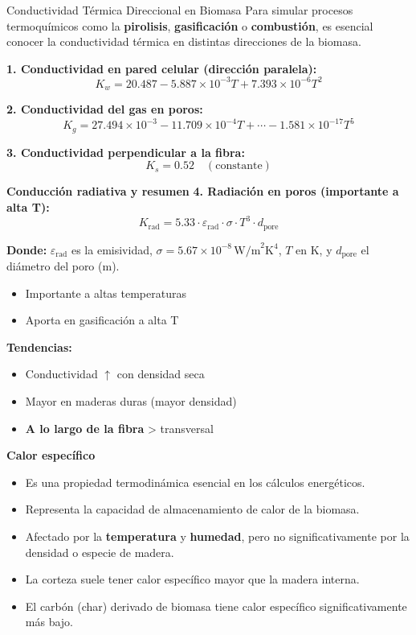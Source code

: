 \documentclass[../../main.tex]{subfiles}
\begin{document}
\begin{frame}{Conductividad Térmica Direccional en Biomasa}
\small
\justifying
Para simular procesos termoquímicos como la \textbf{pirolisis}, \textbf{gasificación} o \textbf{combustión}, es esencial conocer la conductividad térmica en distintas direcciones de la biomasa.

\textbf{1. Conductividad en pared celular (dirección paralela):}
\[
K_w = 20.487 - 5.887 \times 10^{-3} T + 7.393 \times 10^{-6} T^2
\]

\textbf{2. Conductividad del gas en poros:}
\[
K_g = 27.494 \times 10^{-3} - 11.709 \times 10^{-4} T + \cdots - 1.581 \times 10^{-17} T^5
\]

\textbf{3. Conductividad perpendicular a la fibra:}
\[
K_s = 0.52 \quad (\text{constante})
\]

\end{frame}





\begin{frame}{\textbf{Conducci\'on radiativa y resumen}}
\textbf{4. Radiación en poros (importante a alta T):}
\[
K_{\text{rad}} = 5.33 \cdot \varepsilon_{\text{rad}} \cdot \sigma \cdot T^3 \cdot d_{\text{pore}}
\]

\textbf{Donde:} \(\varepsilon_{\text{rad}}\) es la emisividad, \(\sigma = 5.67 \times 10^{-8} \, \text{W/m}^2\text{K}^4\), \(T\) en K, y \(d_{\text{pore}}\) el diámetro del poro (m).


\begin{itemize}
  \item Importante a altas temperaturas
  \item Aporta en gasificaci\'on a alta T
\end{itemize}

\vspace{0.5em}
\textbf{Tendencias:}
\begin{itemize}
  \item Conductividad \(\uparrow\) con densidad seca
  \item Mayor en maderas duras (mayor densidad)
  \item \textbf{A lo largo de la fibra} > transversal
\end{itemize}
\end{frame}

\begin{frame}{\textbf{Calor espec\'ifico}}
\begin{itemize}
  \item Es una propiedad termodin\'amica esencial en los c\'alculos energ\'eticos.
  \item Representa la capacidad de almacenamiento de calor de la biomasa.
  \item Afectado por la \textbf{temperatura} y \textbf{humedad}, pero no significativamente por la densidad o especie de madera.
  \item La corteza suele tener calor espec\'ifico mayor que la madera interna.
  \item El carb\'on (char) derivado de biomasa tiene calor espec\'ifico significativamente m\'as bajo.
\end{itemize}
\end{frame}
\end{document}
